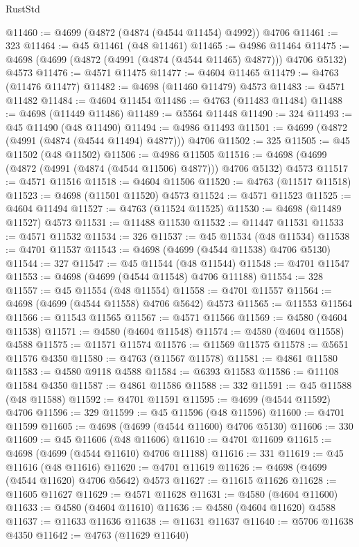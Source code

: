 \begin{lexlean}{RustStd}
\begin{coremodule}
@11460 := @4699 (@4872 (@4874 (@4544 @11454) @4992)) @4706
@11461 := 323
@11464 := @45 @11461 (@48 @11461)
@11465 := @4986 @11464
@11475 := @4698 (@4699 (@4872 (@4991 (@4874 (@4544 @11465) @4877))) @4706 @5132) @4573
@11476 := @4571 @11475
@11477 := @4604 @11465
@11479 := @4763 (@11476 @11477)
@11482 := @4698 (@11460 @11479) @4573
@11483 := @4571 @11482
@11484 := @4604 @11454
@11486 := @4763 (@11483 @11484)
@11488 := @4698 (@11449 @11486)
@11489 := @5564 @11448
@11490 := 324
@11493 := @45 @11490 (@48 @11490)
@11494 := @4986 @11493
@11501 := @4699 (@4872 (@4991 (@4874 (@4544 @11494) @4877))) @4706
@11502 := 325
@11505 := @45 @11502 (@48 @11502)
@11506 := @4986 @11505
@11516 := @4698 (@4699 (@4872 (@4991 (@4874 (@4544 @11506) @4877))) @4706 @5132) @4573
@11517 := @4571 @11516
@11518 := @4604 @11506
@11520 := @4763 (@11517 @11518)
@11523 := @4698 (@11501 @11520) @4573
@11524 := @4571 @11523
@11525 := @4604 @11494
@11527 := @4763 (@11524 @11525)
@11530 := @4698 (@11489 @11527) @4573
@11531 := @11488 @11530
@11532 := @11447 @11531
@11533 := @4571 @11532
@11534 := 326
@11537 := @45 @11534 (@48 @11534)
@11538 := @4701 @11537
@11543 := @4698 (@4699 (@4544 @11538) @4706 @5130)
@11544 := 327
@11547 := @45 @11544 (@48 @11544)
@11548 := @4701 @11547
@11553 := @4698 (@4699 (@4544 @11548) @4706 @11188)
@11554 := 328
@11557 := @45 @11554 (@48 @11554)
@11558 := @4701 @11557
@11564 := @4698 (@4699 (@4544 @11558) @4706 @5642) @4573
@11565 := @11553 @11564
@11566 := @11543 @11565
@11567 := @4571 @11566
@11569 := @4580 (@4604 @11538)
@11571 := @4580 (@4604 @11548)
@11574 := @4580 (@4604 @11558) @4588
@11575 := @11571 @11574
@11576 := @11569 @11575
@11578 := @5651 @11576 @4350
@11580 := @4763 (@11567 @11578)
@11581 := @4861 @11580
@11583 := @4580 @9118 @4588
@11584 := @6393 @11583
@11586 := @11108 @11584 @4350
@11587 := @4861 @11586
@11588 := 332
@11591 := @45 @11588 (@48 @11588)
@11592 := @4701 @11591
@11595 := @4699 (@4544 @11592) @4706
@11596 := 329
@11599 := @45 @11596 (@48 @11596)
@11600 := @4701 @11599
@11605 := @4698 (@4699 (@4544 @11600) @4706 @5130)
@11606 := 330
@11609 := @45 @11606 (@48 @11606)
@11610 := @4701 @11609
@11615 := @4698 (@4699 (@4544 @11610) @4706 @11188)
@11616 := 331
@11619 := @45 @11616 (@48 @11616)
@11620 := @4701 @11619
@11626 := @4698 (@4699 (@4544 @11620) @4706 @5642) @4573
@11627 := @11615 @11626
@11628 := @11605 @11627
@11629 := @4571 @11628
@11631 := @4580 (@4604 @11600)
@11633 := @4580 (@4604 @11610)
@11636 := @4580 (@4604 @11620) @4588
@11637 := @11633 @11636
@11638 := @11631 @11637
@11640 := @5706 @11638 @4350
@11642 := @4763 (@11629 @11640)

\end{coremodule}
\end{lexlean}
